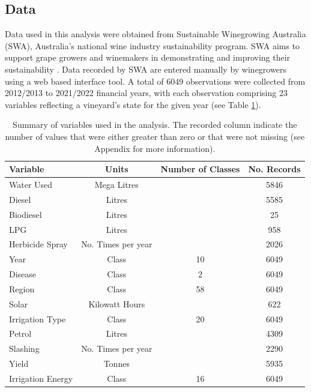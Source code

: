 \documentclass[review,12pt,authoryear]{elsarticle}
\begin{document}
\begin{linenumbers}
\subsection{Data}\label{Data}
% 
Data used in this analysis were obtained from Sustainable Winegrowing Australia (SWA), Australia's national wine industry sustainability program. SWA aims to support grape growers and winemakers in demonstrating and improving their sustainability \citep{swaSustainableWingrowingAustralia2022}. Data recorded by SWA are entered manually by winegrowers using a web based interface tool. A total of 6049 observations were collected from 2012/2013 to 2021/2022 financial years, with each observation comprising 23 variables reflecting a vineyard's state for the given year (see Table \ref{tab:vars}). 
\par
\begin{table}[] 
\caption{Summary of variables used in the analysis. The recorded column indicate the number of values that were either greater than zero or that were not missing (see Appendix for more information).} \label{tab:vars}
 \small
  \begin{tabular}{@{}lccc@{}}
  \toprule
  \textbf{Variable} & \textbf{Units} & \textbf{Number of Classes} & \textbf{No. Records} \\ \midrule
  Water Used & Mega Litres &  & 5846 \\
  Diesel & Litres &  & 5585 \\
  Biodiesel & Litres &  & 25 \\
  LPG & Litres &  & 958 \\
  Herbicide Spray & No. Times per year &  & 2026 \\
  Year & Class & 10 & 6049 \\
  Disease & Class & 2 & 6049 \\
  Region & Class & 58 & 6049 \\
  Solar & Kilowatt Hours &  & 622 \\
  Irrigation Type & Class & 20 & 6049 \\
  Petrol & Litres &  & 4309 \\
  Slashing & No. Times per year &  & 2290 \\
  Yield & Tonnes &  & 5935 \\
  Irrigation Energy & Class & 16 & 6049 \\

\end{tabular}
\end{table}
\end{linenumbers}
\end{document}
